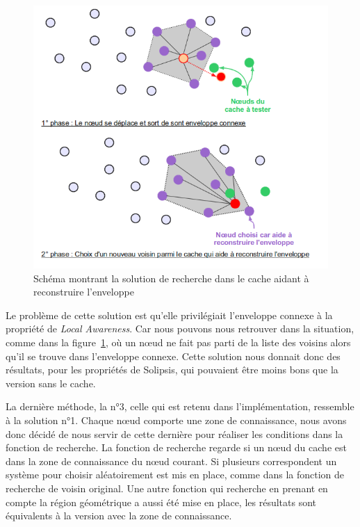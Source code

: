 	\begin{figure}[!h]
        \centering
        \includegraphics[scale=0.45]{./Ressources/Images/cacheReconstructEnvelop.png}
        \caption{Schéma montrant la solution de recherche dans le cache aidant à reconstruire l'enveloppe}
        \label{schemaEnvelopCache}
        \end{figure}
Le problème de cette solution est qu'elle privilégiait l'enveloppe connexe à la propriété de \textit{Local Awareness}. Car nous pouvons nous retrouver dans la situation, comme dans la figure~\ref{schemaEnvelopCache}, où un nœud ne fait pas parti de la liste des voisins alors qu'il se trouve dans l'enveloppe connexe. Cette solution nous donnait donc des résultats, pour les propriétés de Solipsis, qui pouvaient être moins bons que la version sans le cache.  

\par La dernière méthode, la n°3, celle qui est retenu dans l'implémentation, ressemble à la solution n°1. Chaque nœud comporte une zone de connaissance, nous avons donc décidé de nous servir de cette dernière pour réaliser les conditions dans la fonction de recherche. La fonction de recherche regarde si un nœud du cache est dans la zone de connaissance du nœud courant. Si plusieurs correspondent un système pour choisir aléatoirement est mis en place, comme dans la fonction de recherche de voisin original. Une autre fonction qui recherche en prenant en compte la région géométrique a aussi été mise en place, les résultats sont équivalents à la version avec la zone de connaissance.


